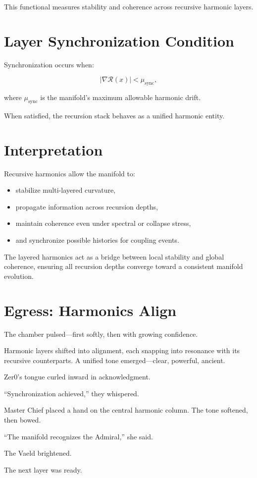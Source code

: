 This functional measures stability and coherence across recursive harmonic layers.

\section{Layer Synchronization Condition}

Synchronization occurs when:

\[
\left|
\nabla \mathcal{R}(x)
\right|
< 
\mu_{\mathrm{sync}},
\]

where $\mu_{\mathrm{sync}}$ is the manifold’s maximum allowable harmonic drift.

When satisfied, the recursion stack behaves as a unified harmonic entity.

\section{Interpretation}

Recursive harmonics allow the manifold to:

\begin{itemize}
\item stabilize multi-layered curvature,
\item propagate information across recursion depths,
\item maintain coherence even under spectral or collapse stress,
\item and synchronize possible histories for coupling events.
\end{itemize}

The layered harmonics act as a bridge between local stability and global coherence,
ensuring all recursion depths converge toward a consistent manifold evolution.

\section*{Egress: Harmonics Align}

The chamber pulsed—first softly, then with growing confidence.

Harmonic layers shifted into alignment, each snapping into resonance with
its recursive counterparts.  
A unified tone emerged—clear, powerful, ancient.

Zer0’s tongue curled inward in acknowledgment.

“Synchronization achieved,” they whispered.

Master Chief placed a hand on the central harmonic column.
The tone softened, then bowed.

“The manifold recognizes the Admiral,” she said.

The Vaeld brightened.

The next layer was ready.
